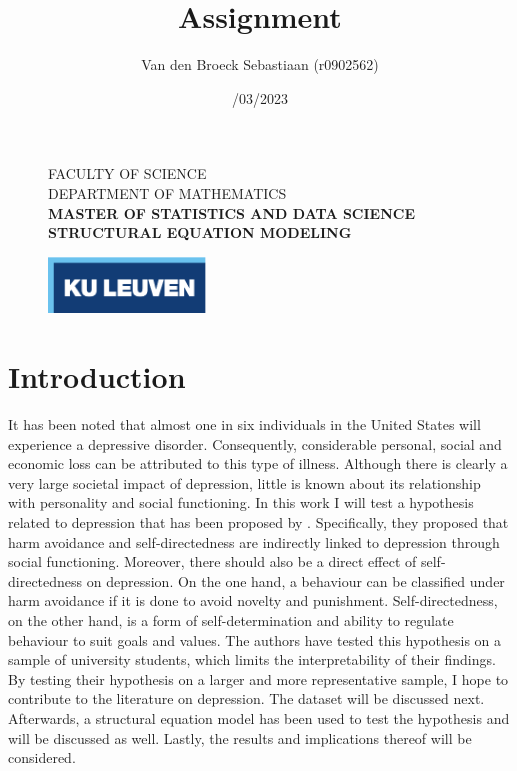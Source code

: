 \documentclass[11pt]{article}
\title{\vspace*{40.0mm}
  \bf\sf Assignment
         \vspace*{20.0mm} \\
  \vspace*{40.0mm}}
\author{\sf Van den Broeck Sebastiaan (r0902562)}
\date{\sf 13/03/2023}
\begin{document}
\begin{figure}
  \parbox[t]{125mm}{
    \vspace*{6mm}
    \scriptsize\sf           FACULTY OF SCIENCE \\
    \scriptsize\sf           DEPARTMENT OF MATHEMATICS \\
    \scriptsize\sf\bfseries  MASTER OF STATISTICS AND DATA SCIENCE \\
    \scriptsize\sf\bfseries  STRUCTURAL EQUATION MODELING \\}
  \parbox[t]{40mm}{
    \begin{flushright}
      \includegraphics[height=15mm]{logo.eps.pdf}
    \end{flushright}}
\end{figure}

\maketitle
\thispagestyle{empty}
\raggedbottom

\cleardoublepage
\setcounter{page}{1}
\setcounter{tocdepth}{3}

\section{Introduction}

It has been noted that almost one in six individuals in the United States will
experience a depressive disorder. Consequently, considerable personal, social and
economic loss can be attributed to this type of illness. Although there is clearly
a very large societal impact of depression, little is known about its relationship
with personality and social functioning. In this work I will test a hypothesis
related to depression that has been proposed by \textcite{tse2011}. Specifically,
they proposed that harm avoidance and self-directedness are indirectly linked to
depression through social functioning. Moreover, there should also be a direct effect
of self-directedness on depression. On the one hand, a behaviour can be classified
under harm avoidance if it is done to avoid novelty and punishment. Self-directedness,
on the other hand, is a form of self-determination and ability to regulate behaviour
to suit goals and values. The authors have tested this hypothesis on a sample of
university students, which limits the interpretability of their findings. By
testing their hypothesis on a larger and more representative sample, I hope to
contribute to the literature on depression. The dataset will be discussed next.
Afterwards, a structural equation model has been used to test the hypothesis and
will be discussed as well. Lastly, the results and implications thereof will be
considered.
\end{document}
